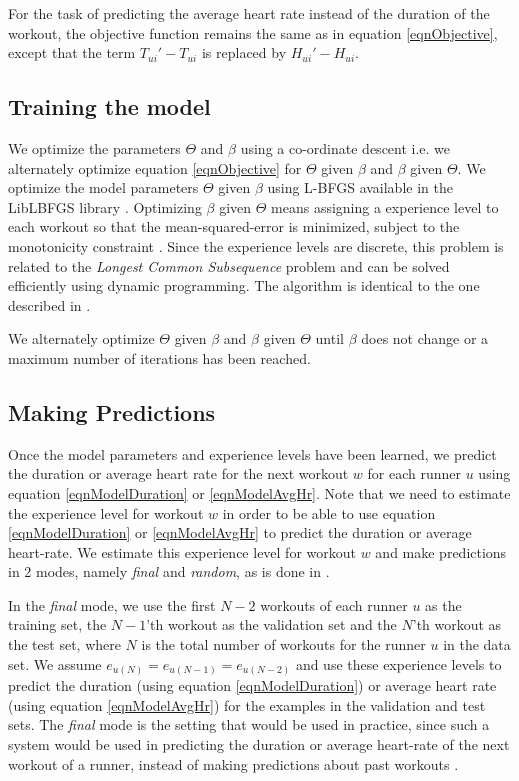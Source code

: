 \documentclass{acm_proc_article-sp}
\begin{document}
For the task of predicting the average heart rate instead of the duration of the workout, the objective function remains the same as in equation \ref{eqnObjective}, except that the term $T_{ui}' - T_{ui}$ is replaced by $H_{ui}' - H_{ui}$.

\subsection{Training the model}
We optimize the parameters $\Theta$ and $\beta$ using a co-ordinate descent \cite{coordinateDescentWiki} i.e. we alternately optimize equation \ref{eqnObjective} for $\Theta$ given $\beta$ and $\beta$ given $\Theta$. We optimize the model parameters $\Theta$ given $\beta$ using L-BFGS \cite{lbfgs} available in the LibLBFGS library \cite{liblbfgs}. Optimizing $\beta$ given $\Theta$ means assigning a experience level to each workout so that the mean-squared-error is minimized, subject to the monotonicity constraint \cite{www13}. Since the experience levels are discrete, this problem is related to the \emph{Longest Common Subsequence} problem \cite{lcs} and can be solved efficiently using dynamic programming. The algorithm is identical to the one described in \cite{www13}.

We alternately optimize $\Theta$ given $\beta$ and $\beta$ given $\Theta$ until $\beta$ does not change or a maximum number of iterations has been reached.

\subsection{Making Predictions}
Once the model parameters and experience levels have been learned, we predict the duration or average heart rate for the next workout $w$ for each runner $u$ using equation \ref{eqnModelDuration} or \ref{eqnModelAvgHr}. Note that we need to estimate the experience level for workout $w$ in order to be able to use equation \ref{eqnModelDuration} or \ref{eqnModelAvgHr} to predict the duration or average heart-rate. We estimate this experience level for workout $w$ and make predictions in 2 modes, namely \emph{final} and \emph{random}, as is done in \cite{www13}. 

In the \emph{final} mode, we use the first $N-2$ workouts of each runner $u$ as the training set, the $N-1$'th workout as the validation set and the $N$'th workout as the test set, where $N$ is the total number of workouts for the runner $u$ in the data set. We assume $e_{u(N)} = e_{u(N-1)} = e_{u(N-2)}$ and use these experience levels to predict the duration (using equation \ref{eqnModelDuration}) or average heart rate (using equation \ref{eqnModelAvgHr}) for the examples in the validation and test sets. The \emph{final} mode is the setting that would be used in practice, since such a system would be used in predicting the duration or average heart-rate of the next workout of a runner, instead of making predictions about past workouts \cite{www13}.
\end{document}
